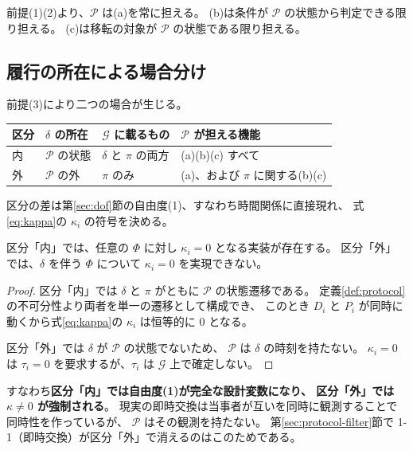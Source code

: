 前提(1)(2)より、$\mathcal{P}$ は(a)を常に担える。
(b)は条件が $\mathcal{P}$ の状態から判定できる限り担える。
(c)は移転の対象が $\mathcal{P}$ の状態である限り担える。

\subsection{履行の所在による場合分け}

前提(3)により二つの場合が生じる。

\begin{center}
\begin{tabularx}{\textwidth}{@{}llXX@{}}
\toprule
区分 & $\delta$ の所在 & $\mathcal{G}$ に載るもの & $\mathcal{P}$ が担える機能 \\
\midrule
内 & $\mathcal{P}$ の状態 & $\delta$ と $\pi$ の両方 & (a)(b)(c) すべて \\
外 & $\mathcal{P}$ の外 & $\pi$ のみ & (a)、および $\pi$ に関する(b)(c) \\
\bottomrule
\end{tabularx}
\label{tab:protocol-cases}
\end{center}

区分の差は第\ref{sec:dof}節の自由度(1)、すなわち時間関係に直接現れ、
式\eqref{eq:kappa}の $\kappa_i$ の符号を決める。

\begin{proposition}[同時性]
\label{prop:simultaneity}
区分「内」では、任意の $\Phi$ に対し $\kappa_i=0$ となる実装が存在する。
区分「外」では、$\delta$ を伴う $\Phi$ について $\kappa_i=0$ を実現できない。
\end{proposition}

\begin{proof}
区分「内」では $\delta$ と $\pi$ がともに $\mathcal{P}$ の状態遷移である。
定義\ref{def:protocol}の不可分性より両者を単一の遷移として構成でき、
このとき $D_i$ と $P_i$ が同時に動くから式\eqref{eq:kappa}の $\kappa_i$ は恒等的に $0$ となる。

区分「外」では $\delta$ が $\mathcal{P}$ の状態でないため、
$\mathcal{P}$ は $\delta$ の時刻を持たない。
$\kappa_i=0$ は $\tau_i=0$ を要求するが、$\tau_i$ は $\mathcal{G}$ 上で確定しない。
\end{proof}

すなわち\textbf{区分「内」では自由度(1)が完全な設計変数になり、
区分「外」では $\kappa\neq 0$ が強制される}。
現実の即時交換は当事者が互いを同時に観測することで同時性を作っているが、
$\mathcal{P}$ はその観測を持たない。
第\ref{sec:protocol-filter}節で 1-1（即時交換）が区分「外」で消えるのはこのためである。

